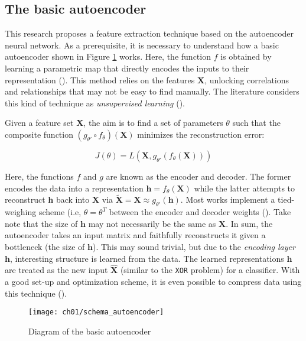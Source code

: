 \subsection{The basic autoencoder}


\par This research proposes a feature extraction technique based on the
autoencoder neural network. As a prerequisite, it is necessary to understand
how a basic autoencoder shown in Figure \ref{schema:autoencoder} works.
Here, the function $f$ is obtained by learning a parametric map that directly
encodes the inputs to their representation (\cite{hinton1994autoencoders}).
This method relies on the features $\mathbf{X}$, unlocking correlations and 
relationships that may not be easy to find manually. The literature considers
this kind of technique as \textit{unsupervised learning} 
(\cite{bengio2013representation}).

\par Given a feature set $\mathbf{X}$, the aim is to find a set of parameters
$\theta$ such that the composite function $(g_{\theta'} \circ f_{\theta})
(\mathbf{X})$ minimizes the reconstruction error:

\[
    J(\theta) = L(\mathbf{X}, g_{\theta'}(f_{\theta}(\mathbf{X})))
\]

\noindent Here, the functions $f$ and $g$ are known as the encoder and decoder.
The former encodes the data into a representation $\mathbf{h} = f_{\theta}
(\mathbf{X})$ while the latter attempts to reconstruct $\mathbf{h}$ back into 
$\mathbf{X}$ via $\mathbf{\widetilde{X}} = \mathbf{X} \approx g_{\theta'}
(\mathbf{h})$. Most works implement a tied-weighing scheme (i.e,
$\theta=\theta^{T}$ between the encoder and decoder weights
(\cite{bengio2013representation}). Take note that the
size of $\mathbf{h}$ may not necessarily be the same as $\mathbf{X}$. In sum,
the autoencoder takes an input matrix and faithfully reconstructs it given a
bottleneck (the size of $\mathbf{h}$). This may sound trivial, but due to the
\textit{encoding layer}  $\mathbf{h}$, interesting structure is learned from
the data. The learned representations $\mathbf{h}$ are treated as the new
input $\mathbf{\widehat{X}}$  (similar to the \texttt{XOR} problem) for a
classifier. With a good set-up and optimization scheme, it is even possible to
compress data using this technique (\cite{theis2017lossy}).

\begin{figure}[!t]
  \centering
  \texttt{[image: ch01/schema\_autoencoder]}
  \caption[Diagram of the basic autoencoder]{
      Diagram of the basic autoencoder
  }
  \label{schema:autoencoder}
\end{figure}

